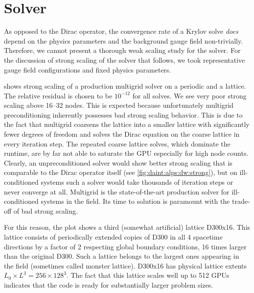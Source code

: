 
\section{Solver}
\label{sec:perf:solver}

As opposed to the Dirac operator, the convergence rate of a Krylov solve \emph{does} depend on the physics parameters and the background gauge field non-trivially.
Therefore, we cannot present a thorough weak scaling study for the solver.
For the discussion of strong scaling of the solver that follows, we took representative gauge field configurations and fixed physics parameters.

 shows strong scaling of a production multigrid solver on a periodic and a \Cstar lattice.
The relative residual is chosen to be $10^{-12}$ for all solves.
We see very poor strong scaling above \numrange{16}{32} nodes.
This is expected because unfortunately multigrid preconditioning inherently possesses bad strong scaling behavior.
This is due to the fact that multigrid coarsens the lattice into a smaller lattice with significantly fewer degrees of freedom and solves the Dirac equation on the coarse lattice in every iteration step.
The repeated coarse lattice solves, which dominate the runtime, are by far not able to saturate the GPU especially for high node counts.
Clearly, an unpreconditioned solver would show better strong scaling that is comparable to the Dirac operator itself (see \cref{fig:daint:alps:dw:strong}), but on ill-conditioned systems such a solver would take thousands of iteration steps or never converge at all.
Multigrid is the state-of-the-art production solver for ill-conditioned systems in the field.
Its time to solution is paramount with the trade-off of bad strong scaling.

For this reason, the plot shows a third (somewhat artificial) lattice D300x16.
This lattice consists of periodically extended copies of D300 in all \num{4} spacetime directions by a factor of \num{2} respecting global boundary conditions, \ie \num{16} times larger than the original D300.
Such a lattice belongs to the largest ones appearing in the field (sometimes called monster lattice).
D300x16 has physical lattice extents $L_0 \times L^{3} = 256 \times 128^{3}$.
The fact that this lattice scales well up to \num{512} GPUs indicates that the code is ready for substantially larger problem sizes.

